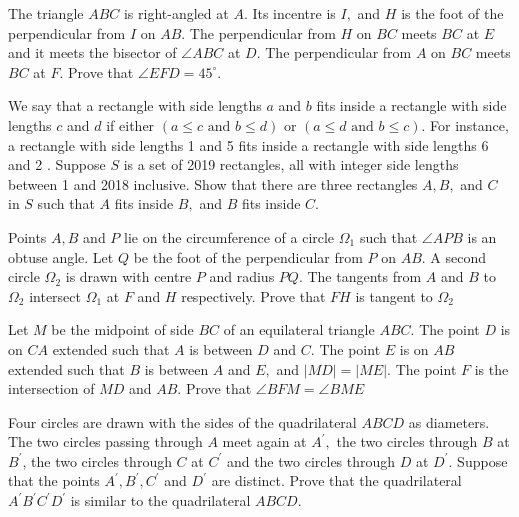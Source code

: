 \documentclass{pset}
\begin{document}
\begin{problems}
\begin{problem}[IrMO 2018 Q2]
    The triangle \(A B C\) is right-angled at \(A .\) Its incentre is \(I,\) and \(H\) is the foot of the perpendicular from \(I\) on \(A B .\) The perpendicular from \(H\) on \(B C\) meets \(B C\) at \(E\) and it meets the bisector of \(\angle A B C\) at \(D .\) The perpendicular from \(A\) on \(B C\) meets \(B C\) at \(F .\) Prove that \(\angle E F D=45^{\circ} .\)
\end{problem}

\begin{problem}[IrMO 2018 Q4]
    We say that a rectangle with side lengths \(a\) and \(b\) fits inside a rectangle with side lengths \(c\) and \(d\) if either \((a \leq c \text { and } b \leq d)\) or \((a \leq d \text { and } b \leq c) .\) For instance, a rectangle with side lengths 1 and 5 fits inside a rectangle with side lengths 6 and 2 . Suppose \(S\) is a set of 2019 rectangles, all with integer side lengths between 1 and 2018 inclusive. Show that there are three rectangles \(A, B,\) and \(C\) in \(S\) such that \(A\) fits inside \(B,\) and \(B\) fits inside \(C .\)
\end{problem}

\begin{problem}[IrMO 2018 Q5]
    Points \(A, B\) and \(P\) lie on the circumference of a circle \(\Omega_{1}\) such that \(\angle A P B\) is an obtuse angle. Let \(Q\) be the foot of the perpendicular from \(P\) on \(A B .\) A second circle \(\Omega_{2}\) is drawn with centre \(P\) and radius \(P Q .\) The tangents from \(A\) and \(B\) to
    \(\Omega_{2}\) intersect \(\Omega_{1}\) at \(F\) and \(H\) respectively. Prove that \(F H\) is tangent to \(\Omega_{2}\)
\end{problem}

\begin{problem}[IrMO 2018 Q8]
    Let \(M\) be the midpoint of side \(B C\) of an equilateral triangle \(A B C .\) The point
    \(D\) is on \(C A\) extended such that \(A\) is between \(D\) and \(C .\) The point \(E\) is on \(A B\) extended such that \(B\) is between \(A\) and \(E,\) and \(|M D|=|M E| .\) The point \(F\) is the intersection of \(M D\) and \(A B .\) Prove that \(\angle B F M=\angle B M E\)
\end{problem}


\begin{problem}[IrMO 2017 Q3]
    Four circles are drawn with the sides of the quadrilateral \(A B C D\) as diameters. The two circles passing through \(A\) meet again at \(A^{\prime},\) the two circles through \(B\) at \(B^{\prime}\), the two circles through \(C\) at \(C^{\prime}\) and the two circles through \(D\) at \(D^{\prime} .\) Suppose that the points \(A^{\prime}, B^{\prime}, C^{\prime}\) and \(D^{\prime}\) are distinct. Prove that the quadrilateral \(A^{\prime} B^{\prime} C^{\prime} D^{\prime}\) is similar to the quadrilateral \(A B C D .\)
    

\end{problem}
\end{problems}
\end{document}

